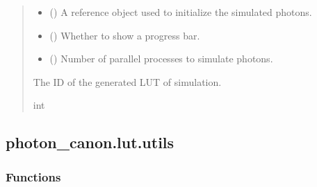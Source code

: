 \documentclass[letterpaper,10pt,english]{sphinxmanual}
\begin{document}
\begin{fulllineitems}
\begin{quote}
\begin{description}
\begin{itemize}
\item {} 
\sphinxAtStartPar
{} ({\hyperref[\detokenize{generated/photon_canon.optics:photon_canon.optics.Photon}]{}}) \textendash{} A reference  object used to initialize the simulated photons.

\item {} 
\sphinxAtStartPar
{} () \textendash{} Whether to show a progress bar.

\item {} 
\sphinxAtStartPar
{} () \textendash{} Number of parallel processes to simulate photons.

\end{itemize}

\sphinxAtStartPar
The ID of the generated LUT of simulation.

\sphinxAtStartPar
int

\end{description}\end{quote}

\end{fulllineitems}


\sphinxstepscope


\subsection{photon\_canon.lut.utils}
\label{\detokenize{generated/photon_canon.lut.utils:module-photon_canon.lut.utils}}\label{\detokenize{generated/photon_canon.lut.utils:photon-canon-lut-utils}}\label{\detokenize{generated/photon_canon.lut.utils::doc}}\subsubsection*{Functions}
\end{document}
